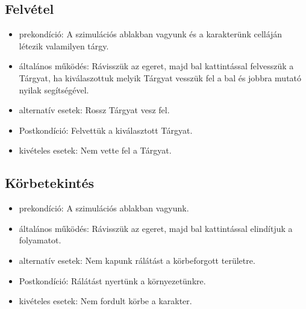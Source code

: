 \subsection{Felvétel}

\begin{itemize}
    \item prekondíció: A szimulációs ablakban vagyunk és a karakterünk celláján létezik valamilyen tárgy.
    \item általános működés: Rávisszük az egeret, majd bal kattintással felvesszük a Tárgyat, ha kiválaszottuk melyik Tárgyat vesszük fel a bal és jobbra mutató nyilak segítségével.
    \item alternatív esetek: Rossz Tárgyat vesz fel.
    \item Postkondíció: Felvettük a kiválasztott Tárgyat.
    \item kivételes esetek: Nem vette fel a Tárgyat.
\end{itemize}

\subsection{Körbetekintés}

\begin{itemize}
    \item prekondíció: A szimulációs ablakban vagyunk.
    \item általános működés: Rávisszük az egeret, majd bal kattintással elindítjuk a folyamatot.
    \item alternatív esetek: Nem kapunk rálátást a körbeforgott területre.
    \item Postkondíció: Rálátást nyertünk a környezetünkre.
    \item kivételes esetek: Nem fordult körbe a karakter.
\end{itemize}
